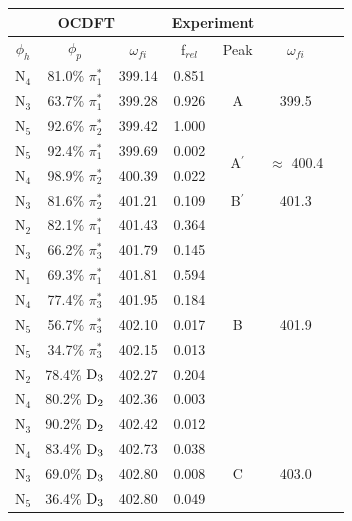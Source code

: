 \documentclass[12pt]{article}
\begin{document}
 \begin{table}
 \centering
     \begin{tabular}{c@{\hskip 0.22in}c@{\hskip 0.22in}c@{\hskip 0.22in}c@{\hskip 0.52in}c@{\hskip 0.22in}c@{\hskip 0.22in}c}
     \hline
     \hline
   \multicolumn{3}{c}{OCDFT} &\multicolumn{2}{c}{Experiment} \\
   \hline
 $\phi_h$ &  $\phi_p$ & $\omega_{fi}$ & f$_{rel}$ & Peak &  $\omega_{fi}$   \\
   \hline
    N$_4$
 &   81.0$\%$ $\pi_1^*$  & 399.14 & 0.851 & \multirow{3}{*}{A} & \multirow{3}{*}{399.5} \\
    N$_3$
 &   63.7$\%$ $\pi_1^*$  & 399.28 & 0.926 \\
    N$_5$
 &   92.6$\%$ $\pi_2^*$  & 399.42 & 1.000 
\vspace{0.1in}\\
    N$_5$
 &   92.4$\%$ $\pi_1^*$  & 399.69 & 0.002 & \multirow{2}{*}{A$^{\prime}$} & \multirow{2}{*}{$\approx$ 400.4}  \\
    N$_4$
 &   98.9$\%$ $\pi_2^*$
 & 400.39 & 0.022 
 \vspace{0.1in}\\
    N$_3$
 &   81.6$\%$ $\pi_2^*$  & 401.21 & 0.109 & B$^{\prime}$ & 401.3 
 \vspace{0.1in}\\
    N$_2$
 &   82.1$\%$ $\pi_1^*$  & 401.43 & 0.364 & \multirow{9}{*}{B} & \multirow{9}{*}{401.9}\\
    N$_3$
 &   66.2$\%$ $\pi_3^*$  & 401.79 & 0.145 \\
    N$_1$
 &   69.3$\%$ $\pi_1^*$  & 401.81 & 0.594 \\
    N$_4$
 &   77.4$\%$ $\pi_3^*$  & 401.95 & 0.184 \\
    N$_5$
 &   56.7$\%$ $\pi_3^*$  & 402.10 & 0.017 \\
    N$_5$
 &   34.7$\%$ $\pi_3^*$  & 402.15 & 0.013 \\
    N$_2$
 &   78.4$\%$ $\rm D_3$  & 402.27 & 0.204 \\
    N$_4$
 &   80.2$\%$ $\rm D_2$  & 402.36 & 0.003 \\
    N$_3$
 &   90.2$\%$ $\rm D_2$  & 402.42 & 0.012 
 \vspace{0.1in}\\
    N$_4$
 &   83.4$\%$ $\rm D_3$  & 402.73 & 0.038 & \multirow{10}{*}{C} & \multirow{10}{*}{403.0}\\
    N$_3$
 &   69.0$\%$ $\rm D_3$  & 402.80 & 0.008 \\
    N$_5$
 &   36.4$\%$ $\rm D_3$  & 402.80 & 0.049 \\

\end{tabular}
\end{table}
\end{document}
